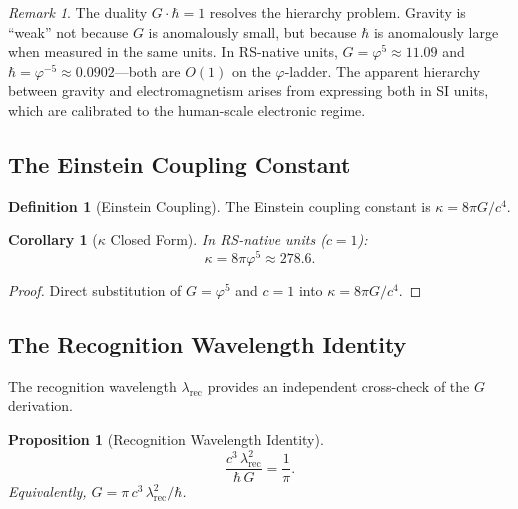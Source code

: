 \documentclass[12pt,a4paper]{article}
\newtheorem{corollary}[theorem]{Corollary}
\newtheorem{proposition}[theorem]{Proposition}
\theoremstyle{definition}
\newtheorem{definition}[theorem]{Definition}
\theoremstyle{remark}
\newtheorem{remark}[theorem]{Remark}
\begin{document}
\begin{remark}
The duality $G \cdot \hbar = 1$ resolves the hierarchy problem.
Gravity is ``weak'' not because $G$ is anomalously small, but
because $\hbar$ is anomalously large when measured in the same
units.  In RS-native units, $G = \varphi^5 \approx 11.09$ and
$\hbar = \varphi^{-5} \approx 0.0902$---both are $O(1)$ on
the $\varphi$-ladder.  The apparent hierarchy between gravity
and electromagnetism arises from expressing both in SI units,
which are calibrated to the human-scale electronic regime.
\end{remark}

\subsection{The Einstein Coupling Constant}

\begin{definition}[Einstein Coupling]
The Einstein coupling constant is $\kappa = 8\pi G/c^4$.
\end{definition}

\begin{corollary}[$\kappa$ Closed Form]
\label{thm:kappa}
In RS-native units ($c = 1$):
\begin{equation}
  \kappa = 8\pi \varphi^5 \approx 278.6.
\end{equation}
\end{corollary}

\begin{proof}
Direct substitution of $G = \varphi^5$ and $c = 1$ into
$\kappa = 8\pi G/c^4$.
\end{proof}

\subsection{The Recognition Wavelength Identity}

The recognition wavelength $\lambda_{\mathrm{rec}}$ provides an
independent cross-check of the $G$ derivation.

\begin{proposition}[Recognition Wavelength Identity]
\label{prop:lambda}
\begin{equation}
  \frac{c^3\,\lambda_{\mathrm{rec}}^2}{\hbar\,G} = \frac{1}{\pi}.
  \label{eq:lambda-rec}
\end{equation}
Equivalently, $G = \pi\,c^3\,\lambda_{\mathrm{rec}}^2/\hbar$.
\end{proposition}
\end{document}
